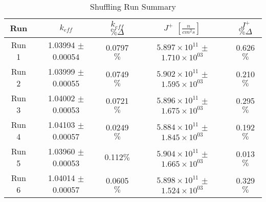 

\begin{table}[H]
\centering
 \begin{tabularx}{0.7\textwidth}{c  c  c  c  c}
 	\hline
 	Run & $k_{eff}$ & $k_{eff}$ $\% \Delta$ & $J^+$  $[\frac{n}{cm^2s}]$ & $J^+$ $\% \Delta$ \\
 	\hline
 	Run 1 & 1.03994 $\pm$ 0.00054 & 0.0797$\%$ & $5.897\times10^{11}$ $\pm$ $1.710\times10^{03}$ & 0.626$\%$ \\
 	Run 2 & 1.03999 $\pm$ 0.00055 & 0.0749$\%$ & $5.902\times10^{11}$ $\pm$ $1.595\times10^{03}$  & 0.210$\%$ \\
 	Run 3 & 1.04002 $\pm$ 0.00053 & 0.0721$\%$ & $5.896\times10^{11}$ $\pm$ $1.675\times10^{03}$ & 0.295$\%$  \\
 	Run 4 & 1.04103 $\pm$ 0.00057 & 0.0249$\%$ & $5.884\times10^{11}$ $\pm$ $1.845\times10^{03}$ & 0.192$\%$ \\
 	Run 5 & 1.03960 $\pm$ 0.00053 & 0.112$\%$ & $5.904\times10^{11}$ $\pm$ $1.665\times10^{03}$ & 0.013$\%$  \\
 	Run 6 & 1.04014 $\pm$ 0.00057 & 0.0605$\%$ & $5.898\times10^{11}$ $\pm$ $1.524\times10^{03}$ & 0.329$\%$ \\
 	\hline

 \end{tabularx}
\caption{Shuffling Run Summary}
\label{table:shufsens}
\end{table}